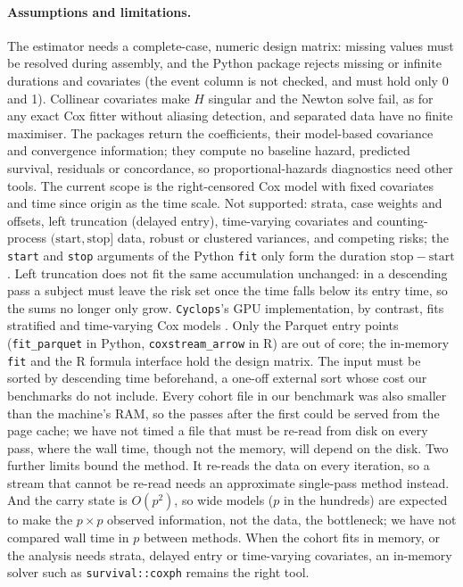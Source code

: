 \documentclass[11pt,a4paper]{article}
\begin{document}
\paragraph{Assumptions and limitations.} The estimator needs a complete-case,
numeric design matrix: missing values must be resolved during assembly, and
the Python package rejects missing or infinite durations and covariates (the
event column is not checked, and must hold only 0 and 1). Collinear covariates
make $H$ singular and the Newton solve fail, as for any exact Cox fitter
without aliasing detection, and separated data have no finite maximiser. The
packages return the coefficients, their model-based covariance and convergence
information; they compute no baseline hazard, predicted survival, residuals or
concordance, so proportional-hazards diagnostics need other tools. The current
scope is the right-censored Cox model with fixed covariates and time since
origin as the time scale. Not supported: strata, case weights and offsets, left
truncation (delayed entry), time-varying covariates and counting-process
$(\mathrm{start}, \mathrm{stop}]$ data, robust or clustered variances, and
competing risks; the \texttt{start} and \texttt{stop} arguments of the Python
\texttt{fit} only form the duration $\mathrm{stop} - \mathrm{start}$. Left
truncation does not fit the same accumulation unchanged: in a descending pass a
subject must leave the risk set once the time falls below its entry time, so
the sums no longer only grow. \texttt{Cyclops}'s GPU implementation, by
contrast, fits stratified and time-varying Cox models \citep{yang2023gpu}.
Only the Parquet entry points
(\texttt{fit\_parquet} in Python, \texttt{coxstream\_arrow} in R) are out of
core; the in-memory \texttt{fit} and the R formula interface hold the design
matrix. The input must be sorted by descending time beforehand, a one-off
external sort whose cost our benchmarks do not include. Every cohort file in
our benchmark was also smaller than the machine's RAM, so the passes after the
first could be served from the page cache; we have not timed a file that must
be re-read from disk on every pass, where the wall time, though not the
memory, will depend on the disk. Two further limits bound the method. It
re-reads the data on every iteration, so a stream that cannot be re-read needs
an approximate single-pass method instead. And the carry state is $O(p^2)$, so
wide models ($p$ in the hundreds) are expected to make the $p \times p$
observed information, not the data, the bottleneck; we have not compared wall
time in $p$ between methods. When the cohort fits in memory, or the analysis
needs strata, delayed entry or time-varying covariates, an in-memory solver
such as \texttt{survival::coxph} remains the right tool.
\end{document}
